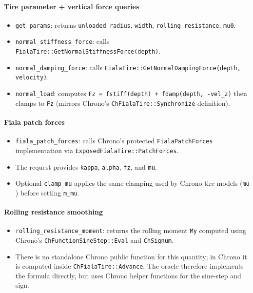 \paragraph{Tire parameter + vertical force queries}
\begin{itemize}
  \item \texttt{get\_params}: returns \texttt{unloaded\_radius}, \texttt{width}, \texttt{rolling\_resistance}, \texttt{mu0}.
  \item \texttt{normal\_stiffness\_force}: calls \texttt{FialaTire::GetNormalStiffnessForce(depth)}.
  \item \texttt{normal\_damping\_force}: calls \texttt{FialaTire::GetNormalDampingForce(depth, velocity)}.
  \item \texttt{normal\_load}: computes \texttt{Fz = fstiff(depth) + fdamp(depth, -vel\_z)} then clamps to \texttt{Fz}
        (mirrors Chrono's \texttt{ChFialaTire::Synchronize} definition).
\end{itemize}

\paragraph{Fiala patch forces}
\begin{itemize}
  \item \texttt{fiala\_patch\_forces}: calls Chrono's protected \texttt{FialaPatchForces} implementation via
        \texttt{ExposedFialaTire::PatchForces}.
  \item The request provides \texttt{kappa}, \texttt{alpha}, \texttt{fz}, and \texttt{mu}.
  \item Optional \texttt{clamp\_mu} applies the same clamping used by Chrono tire models
        (\texttt{mu \in [0.1, 1.0]}) before setting \texttt{m\_mu}.
\end{itemize}

\paragraph{Rolling resistance smoothing}
\begin{itemize}
  \item \texttt{rolling\_resistance\_moment}: returns the rolling moment \texttt{My} computed using
        Chrono's \texttt{ChFunctionSineStep::Eval} and \texttt{ChSignum}.
  \item There is no standalone Chrono public function for this quantity; in Chrono it is computed
        inside \texttt{ChFialaTire::Advance}. The oracle therefore implements the formula directly,
        but uses Chrono helper functions for the sine-step and sign.
\end{itemize}

